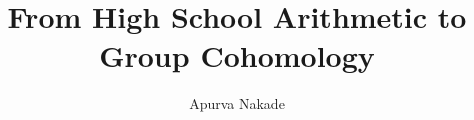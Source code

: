 \documentclass{article}
\title{From High School Arithmetic to Group Cohomology}
\author{Apurva Nakade}
\date{}
\begin{document}
  
	
  
  
  
  
  

  \nocite{Isaksen_A_Cohomological_Viewpoint_on_Elementary_School_Arithmetic}
  \nocite{book:Weibel_Homological_algebra}
\end{document}
